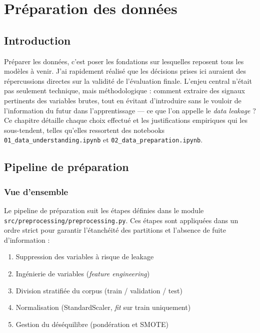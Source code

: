 \chapter{Préparation des données}

\section*{Introduction}

Préparer les données, c'est poser les fondations sur lesquelles reposent tous les modèles
à venir. J'ai rapidement réalisé que les décisions prises ici auraient des répercussions
directes sur la validité de l'évaluation finale. L'enjeu central n'était pas seulement
technique, mais méthodologique : comment extraire des signaux pertinents des variables
brutes, tout en évitant d'introduire sans le vouloir de l'information du futur dans
l'apprentissage --- ce que l'on appelle le \textit{data leakage} ? Ce chapitre détaille
chaque choix effectué et les justifications empiriques qui les sous-tendent, telles
qu'elles ressortent des notebooks \texttt{01\_data\_understanding.ipynb} et
\texttt{02\_data\_preparation.ipynb}.

\section{Pipeline de préparation}

\subsection{Vue d'ensemble}

Le pipeline de préparation suit les étapes définies dans le module
\texttt{src/preprocessing/preprocessing.py}. Ces étapes sont appliquées dans un ordre
strict pour garantir l'étanchéité des partitions et l'absence de fuite d'information :

\begin{enumerate}
  \item Suppression des variables à risque de leakage
  \item Ingénierie de variables (\textit{feature engineering})
  \item Division stratifiée du corpus (train / validation / test)
  \item Normalisation (StandardScaler, \textit{fit} sur train uniquement)
  \item Gestion du déséquilibre (pondération et SMOTE)
\end{enumerate}

